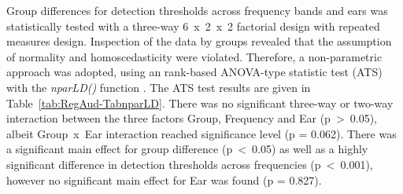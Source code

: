 \documentclass[a4paper, twoside]{templates/ociamthesis}
\begin{document}
\begin{table}

\caption{\label{tab:RegAud-Tab1}Standard audiometry: Descriptives for pure-tone detection thresholds by frequency bands and ear split by the two groups.}
\centering
{}
\end{table}

Group differences for detection thresholds across frequency bands and ears was statistically tested with a three-way 6~x~2~x~2 factorial design with repeated measures design. Inspection of the data by groups revealed that the assumption of normality and homoscedasticity were violated. Therefore, a non-parametric approach was adopted, using an rank-based ANOVA-type statistic test (ATS) with the \emph{nparLD()} function \autocite[nparLD package;][]{nparLDPackageR}. The ATS test results are given in Table~\ref{tab:RegAud-TabnparLD}. There was no significant three-way or two-way interaction between the three factors Group, Frequency and Ear (p~\textgreater~0.05), albeit Group~x~Ear interaction reached significance level (p = 0.062). There was a significant main effect for group difference (p~\textless~0.05) as well as a highly significant difference in detection thresholds across frequencies (p~\textless~0.001), however no significant main effect for Ear was found (p = 0.827).\\
\end{document}
